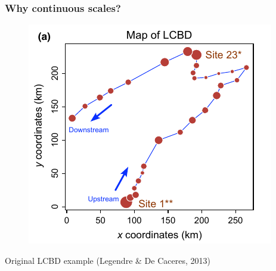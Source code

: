 \documentclass[10pt, aspectratio=1610]{beamer}
\begin{document}
\begin{frame}
  \frametitle{Why continuous scales?}
  \begin{figure}
    \centering
    \hspace*{-0cm}\includegraphics[scale=0.5]{fig/lcbd_LegeDeCa2013.png}
  \end{figure}
  \centering
  Original LCBD example (Legendre \& De Caceres, 2013)
\end{frame}
\end{document}
